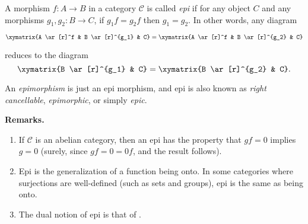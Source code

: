 \documentclass[12pt]{article}
\begin{document}
A morphism $f : A\to B$ in a category $\mathcal{C}$ is called {\em epi} if for any object $C$ and any morphisms $g_1,g_2 : B\to C$, if $g_1 f = g_2 f$ then $g_1 = g_2$.  In other words, any diagram 
\begin{center}
$\xymatrix{A \ar[r]^f & B \ar[r]^{g_1} & C}=\xymatrix{A \ar[r]^f & B \ar[r]^{g_2} & C}$
\end{center}
reduces to the diagram $$\xymatrix{B \ar[r]^{g_1} & C}=\xymatrix{B \ar[r]^{g_2} & C}.$$

An \emph{epimorphism} is just an epi morphism, and epi is also known as \emph{right cancellable}, \emph{epimorphic}, or simply \emph{epic}.

\textbf{Remarks.}
\begin{enumerate}
\item If $\mathcal{C}$ is an abelian category, then an epi has the property that $gf=0$ implies $g=0$ (surely, since $gf=0=0f$, and the result follows).
\item Epi is the generalization of a function being onto.  In some categories where surjections are well-defined (such as sets and groups), epi is the same as being onto.
\item The dual notion of epi is that of .
\end{enumerate}
\end{document}

